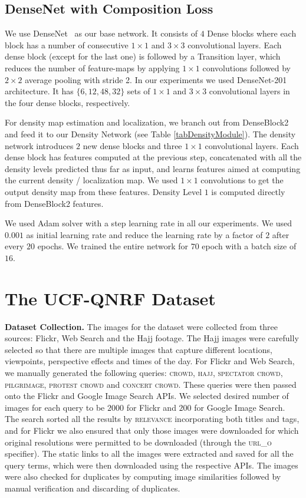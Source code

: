 \documentclass[runningheads]{llncs}
\begin{document}
\subsection{DenseNet with Composition Loss}


We use DenseNet~\cite{huang2016densely} as our base network. It consists of $4$ Dense blocks where each block has a number of consecutive $1 \times 1$ and $3 \times 3$ convolutional layers. Each dense block (except for the last one) is followed by a Transition layer, which reduces the number of feature-maps by applying $1 \times 1$ convolutions followed by $2 \times 2$ average pooling with stride 2. In our experiments we used DenseNet-201 architecture. It has $\{6, 12, 48, 32\}$ sets of $1 \times 1$ and $3 \times 3$ convolutional layers in the four dense blocks, respectively.

For density map estimation and localization, we branch out from DenseBlock2 and feed it to our Density Network (see Table \ref{tabDensityModule}). The density network introduces $2$ new dense blocks and three $1 \times 1$  convolutional layers. Each dense block has features computed at the previous step, concatenated with all the density levels predicted thus far as input, and learns features aimed at computing the current density / localization map. We used $1 \times 1$ convolutions to get the output density map from these features. Density Level $1$ is computed directly from DenseBlock2 features.

We used Adam solver with a step learning rate in all our experiments. We used $0.001$ as initial learning rate and reduce the learning rate by a factor of $2$ after every $20$ epochs. We trained the entire network for $70$ epoch with a batch size of $16$.

\section{The UCF-QNRF Dataset}\label{secDataset}
\smallskip
\noindent\textbf{Dataset Collection.} The images for the dataset were collected from three sources: Flickr, Web Search and the Hajj footage. The Hajj images were carefully selected so that there are multiple images that capture different locations, viewpoints, perspective effects and times of the day. For Flickr and Web Search, we manually generated the following queries: \textsc{crowd}, \textsc{hajj}, \textsc{spectator crowd}, \textsc{pilgrimage}, \textsc{protest crowd} and \textsc{concert crowd}. These queries were then passed onto the Flickr and Google Image Search APIs. We selected desired number of images for each query to be $2000$ for Flickr and $200$ for Google Image Search. The search sorted all the results by \textsc{relevance} incorporating both titles and tags, and for Flickr we also ensured that only those images were downloaded for which original resolutions were permitted to be downloaded (through the \textsc{url\_o} specifier). The static links to all the images were extracted and saved for all the query terms, which were then downloaded using the respective APIs. The images were also checked for duplicates by computing image similarities followed by manual verification and discarding of duplicates.
\vskip 0.1in
\end{document}

